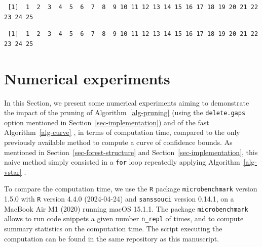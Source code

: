 \documentclass[
  11pt,
  a4paper,
]{article}
\newenvironment{Shaded}{}{}
\newcommand{\AttributeTok}[1]{\textcolor[rgb]{0.84,0.23,0.29}{#1}}
\newcommand{\ConstantTok}[1]{\textcolor[rgb]{0.00,0.36,0.77}{#1}}
\newcommand{\FunctionTok}[1]{\textcolor[rgb]{0.44,0.26,0.76}{#1}}
\newcommand{\NormalTok}[1]{\textcolor[rgb]{0.14,0.16,0.18}{#1}}
\newcommand{\OtherTok}[1]{\textcolor[rgb]{0.44,0.26,0.76}{#1}}
\newcommand{\SpecialCharTok}[1]{\textcolor[rgb]{0.00,0.36,0.77}{#1}}
\theoremstyle{plain}
\theoremstyle{definition}
\theoremstyle{plain}
\theoremstyle{definition}
\theoremstyle{plain}
\theoremstyle{remark}
\begin{document}
\begin{verbatim}
 [1]  1  2  3  4  5  6  7  8  9 10 11 12 13 14 15 16 17 18 19 20 21 22 23 24 25
\end{verbatim}

\begin{Shaded}
\end{Shaded}

\begin{verbatim}
 [1]  1  2  3  4  5  6  7  8  9 10 11 12 13 14 15 16 17 18 19 20 21 22 23 24 25
\end{verbatim}

\section{Numerical experiments}\label{sec-numeric}

In this Section, we present some numerical experiments aiming to
demonstrate the impact of the pruning of  Algorithm~\ref{alg-pruning} 
(using the \texttt{delete.gaps} option mentioned in
Section~\ref{sec-implementation}) and of the fast
 Algorithm~\ref{alg-curve} , in terms of computation time, compared to
the only previously available method to compute a curve of confidence
bounds. As mentioned in Section~\ref{sec-forest-structure} and
Section~\ref{sec-implementation}, this naive method simply consisted in
a \texttt{for} loop repeatedly applying  Algorithm~\ref{alg-vstar} .

To compare the computation time, we use the \texttt{R} package
\texttt{microbenchmark} version 1.5.0 \citep{microbenchmark} with
\texttt{R} version 4.4.0 (2024-04-24) and \texttt{sanssouci} version
0.14.1, on a MacBook Air M1 (2020) running macOS 15.1.1. The package
\texttt{microbenchmark} allows to run code snippets a given number
\texttt{n\_repl} of times, and to compute summary statistics on the
computation time. The script executing the computation can be found in
the same repository as this manuscript.
\end{document}

